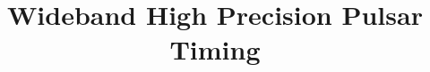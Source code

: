 \documentclass[useAMS,usenatbib]{mn2e}
\begin{document}
\title[Wideband High Precision Pulsar Timing]{Wideband High Precision Pulsar Timing}

\end{document}
